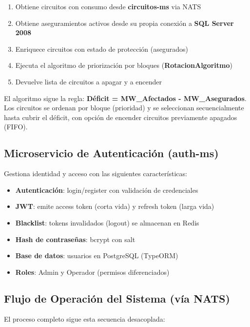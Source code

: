\begin{enumerate}
    \item Obtiene circuitos con consumo desde \textbf{circuitos-ms} via NATS
    \item Obtiene aseguramientos activos desde su propia conexión a \textbf{SQL Server 2008}
    \item Enriquece circuitos con estado de protección (asegurados)
    \item Ejecuta el algoritmo de priorización por bloques (\textbf{RotacionAlgoritmo})
    \item Devuelve lista de circuitos a apagar y a encender
\end{enumerate}

El algoritmo sigue la regla: \textbf{Déficit = MW\_Afectados - MW\_Asegurados}. Los circuitos se ordenan por bloque (prioridad) y se seleccionan secuencialmente hasta cubrir el déficit, con opción de encender circuitos previamente apagados (FIFO).

\subsection{Microservicio de Autenticación (auth-ms)}
Gestiona identidad y acceso con las siguientes características:

\begin{itemize}
    \item \textbf{Autenticación}: login/register con validación de credenciales
    \item \textbf{JWT}: emite access token (corta vida) y refresh token (larga vida)
    \item \textbf{Blacklist}: tokens invalidados (logout) se almacenan en Redis
    \item \textbf{Hash de contraseñas}: bcrypt con salt
    \item \textbf{Base de datos}: usuarios en PostgreSQL (TypeORM)
    \item \textbf{Roles}: Admin y Operador (permisos diferenciados)
\end{itemize}

\subsection{Flujo de Operación del Sistema (vía NATS)}
El proceso completo sigue esta secuencia desacoplada:

